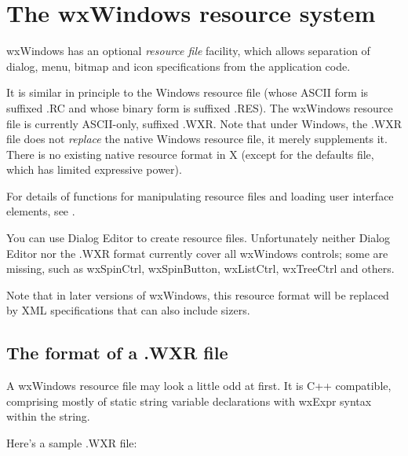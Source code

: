 \section{The wxWindows resource system}\label{resourceformats}

wxWindows has an optional {\it resource file} facility,
which allows separation of dialog, menu, bitmap and icon specifications
from the application code.

It is similar in principle to the Windows resource file (whose ASCII form is
suffixed .RC and whose binary form is suffixed .RES). The wxWindows resource
file is currently ASCII-only, suffixed .WXR. Note that under Windows,
the .WXR file does not {\it replace} the native Windows resource file,
it merely supplements it. There is no existing native resource format in X
(except for the defaults file, which has limited expressive power).

For details of functions for manipulating resource files and loading
user interface elements, see .

You can use Dialog Editor to create resource files. Unfortunately neither
Dialog Editor nor the .WXR format currently cover all wxWindows controls;
some are missing, such as wxSpinCtrl, wxSpinButton, wxListCtrl, wxTreeCtrl and others.

Note that in later versions of wxWindows, this resource format will be replaced
by XML specifications that can also include sizers.

\subsection{The format of a .WXR file}

A wxWindows resource file may look a little odd at first. It is C++
compatible, comprising mostly of static string variable declarations with
wxExpr syntax within the string.

Here's a sample .WXR file:

